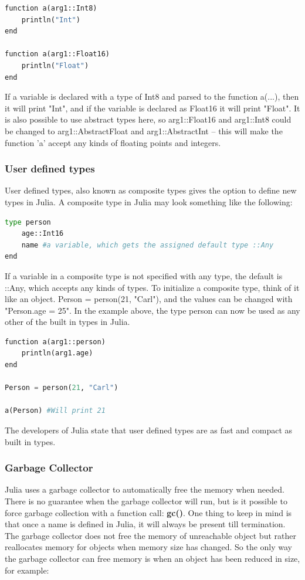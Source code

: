 \documentclass[a4paper, 11pt, titlepage]{article}
\begin{document}
\begin{lstlisting}[language=python]
function a(arg1::Int8)
	println("Int")  
end

function a(arg1::Float16)  
	println("Float")  
end    
\end{lstlisting}
If a variable is declared with a type of Int8 and parsed to the function a(...), then it will print "Int", and if the variable is declared as Float16 it will print "Float". It is also possible to use abstract types here, so arg1::Float16 and arg1::Int8 could be changed to arg1::AbstractFloat and arg1::AbstractInt – this will make the function 'a' accept any kinds of floating points and integers.  
\subsubsection{User defined types}
User defined types, also known as composite types gives the option to define new types in Julia. A composite type in Julia may look something like the following: 
\begin{lstlisting}[language=python]
type person 
	age::Int16 
	name #a variable, which gets the assigned default type ::Any
end    
\end{lstlisting}
If a variable in a composite type is not specified with any type, the default is ::Any, which accepts any kinds of types. To initialize a composite type, think of it like an object. Person = person(21, "Carl"), and the values can be changed with "Person.age = 25".
In the example above, the type person can now be used as any other of the built in types in Julia.
\begin{lstlisting}[language=python]
function a(arg1::person)
	println(arg1.age)
end

Person = person(21, "Carl")

a(Person) #Will print 21
\end{lstlisting}
The developers of Julia state that user defined types are as fast and compact as built in types. 

\subsubsection{Garbage Collector}
Julia uses a garbage collector to automatically free the memory when needed. There is no guarantee when the garbage collector will run, but is it possible to force garbage collection with a function call: \textbf{gc()}. One thing to keep in mind is that once a name is defined in Julia, it will always be present till termination. The garbage collector does not free the memory of unreachable object but rather reallocates memory for objects when memory size has changed. So the only way the garbage collector can free memory is when an object has been reduced in size, for example:
\end{document}
